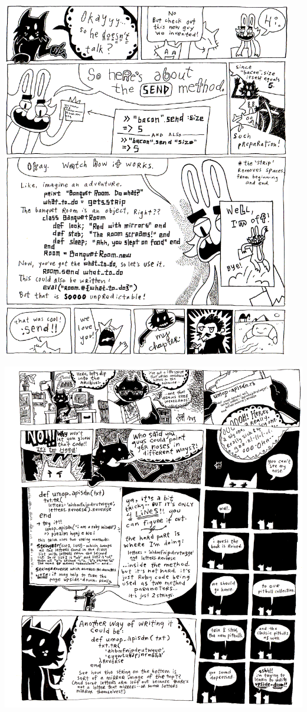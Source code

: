 \documentclass[10pt,twoside]{report}
\begin{document}
\vspace*{0.6cm} \includegraphics[width=0.955\textwidth]{cache/86.png}
\newpage

\vspace*{0.6cm} \includegraphics[width=1.0\textwidth]{cache/87.png}
\newpage
\end{document}
